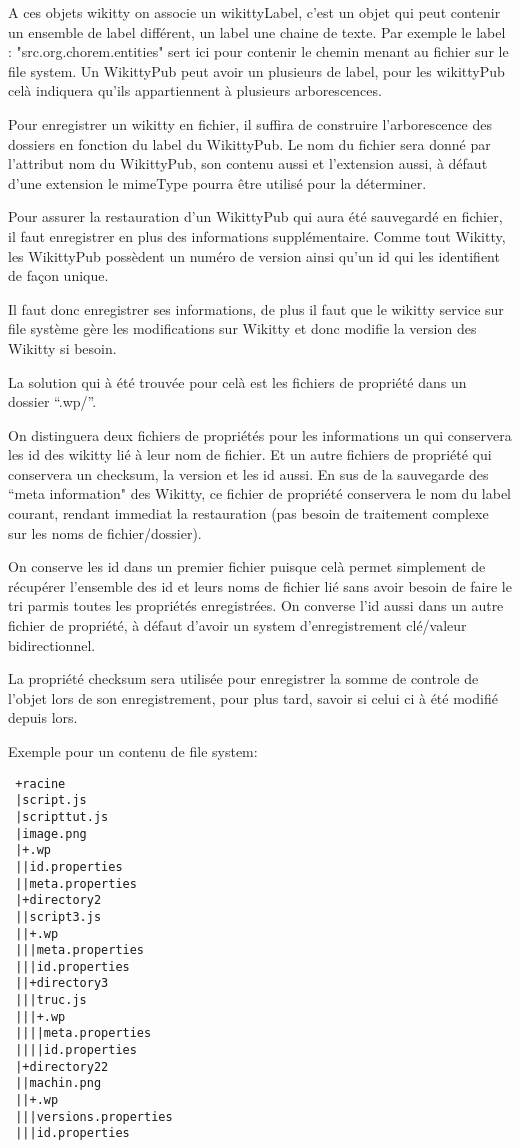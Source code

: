 A ces objets wikitty on associe un wikittyLabel, c'est un objet qui peut
contenir un ensemble de label différent, un label une chaine de texte.
Par exemple le label : "src.org.chorem.entities" sert ici pour contenir le
chemin menant au fichier sur le file system. Un WikittyPub peut avoir un
plusieurs de label, pour les wikittyPub celà indiquera qu'ils appartiennent à
plusieurs arborescences.

Pour enregistrer un wikitty en fichier, il suffira de construire l'arborescence
des dossiers en fonction du label du WikittyPub. Le nom du fichier sera donné
par l'attribut nom du WikittyPub, son contenu aussi et l'extension aussi, à
défaut d'une extension le mimeType pourra être utilisé pour la déterminer.

Pour assurer la restauration d'un WikittyPub qui aura été sauvegardé en fichier,
il faut enregistrer en plus des informations supplémentaire. Comme tout Wikitty,
les WikittyPub possèdent un numéro de version ainsi qu'un id qui les identifient
de façon unique.

Il faut donc enregistrer ses informations, de plus il faut que le wikitty
service sur file système gère les modifications sur Wikitty et donc modifie la
version des Wikitty si besoin.

La solution qui à été trouvée pour celà est les fichiers de propriété dans un
dossier ``.wp/''. 

On distinguera deux fichiers de propriétés pour les informations un qui 
conservera les id des wikitty lié à leur nom de fichier. Et un autre fichiers de
propriété qui conservera un checksum, la version et les id aussi. En sus de
la sauvegarde des ``meta information" des Wikitty, ce fichier de propriété
conservera le nom du label courant, rendant immediat la restauration (pas
besoin de traitement complexe sur les noms de fichier/dossier).

On conserve les id dans un premier fichier puisque celà permet simplement de 
récupérer l'ensemble des id et leurs noms de fichier lié sans avoir besoin de 
faire le tri parmis toutes les propriétés enregistrées. On converse l'id aussi 
dans un autre fichier de propriété, à défaut d'avoir un system d'enregistrement
clé/valeur bidirectionnel. 

La propriété checksum sera utilisée pour enregistrer la somme de controle de 
l'objet lors de son enregistrement, pour plus tard, savoir si celui ci à été
modifié depuis lors.

Exemple pour un contenu de file system:
\begin{verbatim}
 +racine
 |script.js
 |scripttut.js
 |image.png
 |+.wp
 ||id.properties 
 ||meta.properties 
 |+directory2
 ||script3.js
 ||+.wp
 |||meta.properties
 |||id.properties 
 ||+directory3
 |||truc.js
 |||+.wp
 ||||meta.properties
 ||||id.properties 
 |+directory22
 ||machin.png
 ||+.wp
 |||versions.properties
 |||id.properties 
\end{verbatim}



